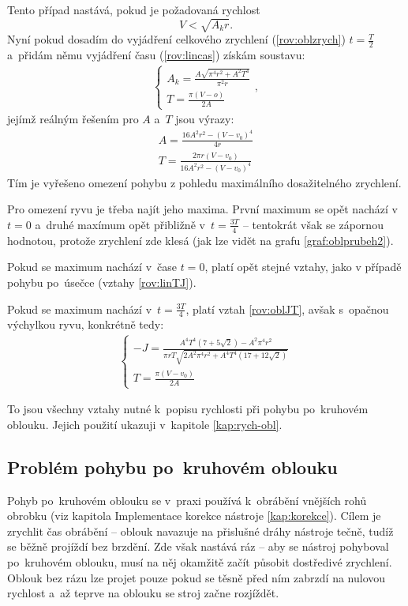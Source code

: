 		Tento případ nastává, pokud je požadovaná rychlost
		\begin{equation}
			V<\sqrt{A_k r}.
		\end{equation}
		Nyní pokud dosadím do vyjádření celkového zrychlení (\ref{rov:oblzrych}) $t=\frac{T}{2}$ a~přidám němu vyjádření času (\ref{rov:lincas}) získám soustavu:
		\begin{eqnarray}\label{rov:oblak}
			\begin{cases}
			A_k = \frac{A\sqrt{\pi^4r^2+A^2T^4}}{\pi^2r} \\
			T = \frac{\pi \left(V-o\right)}{2A}
			\end{cases},
		\end{eqnarray}
		jejímž reálným řešením pro $A$ a~$T$ jsou výrazy:
		\begin{eqnarray}\label{rov:oblt2a}
			A = \frac{16A^2r^2-\left(V-v_0\right)^4}{4r} \nonumber \\
			T = \frac{2\pi r \left(V-v_0\right)}{16A^2r^2-\left(V-v_0\right)^4}
		\end{eqnarray}
		Tím je vyřešeno omezení pohybu z pohledu maximálního dosažitelného zrychlení.
		
		Pro omezení ryvu je třeba najít jeho maxima. První maximum se opět nachází v~$t=0$ a~druhé maxímum opět přibližně v~$t=\frac{3T}{4}$ -- tentokrát však se zápornou hodnotou, protože zrychlení zde klesá (jak lze vidět na grafu \ref{graf:oblprubeh2}).
		
		Pokud se maximum nachází v~čase $t=0$, platí opět stejné vztahy, jako v případě pohybu po~úsečce (vztahy \ref{rov:linTJ}).
		
		Pokud se maximum nachází v~$t=\frac{3T}{4}$, platí vztah \ref{rov:oblJT}, avšak s~opačnou výchylkou ryvu, konkrétně tedy:
		\begin{eqnarray}
			\label{rov:oblJT2}
			\begin{cases}
			-J=\frac{A^4T^4\left(7+5\sqrt{2}\right)-A^2\pi^4r^2}{\pi rT\sqrt{2A^2\pi^4r^2+A^4T^4\left(17+12\sqrt{2}\right)}} \nonumber \\
			T=\frac{\pi(V-v_0)}{2A}
			\end{cases}
		\end{eqnarray}
		
		To jsou všechny vztahy nutné k~popisu rychlosti při pohybu po~kruhovém oblouku. Jejich použití ukazuji v~kapitole \ref{kap:rych-obl}.
		
		\subsection{Problém pohybu po~kruhovém oblouku}
		Pohyb po~kruhovém oblouku se v~praxi používá k~obrábění vnějších rohů obrobku (viz kapitola Implementace korekce nástroje \ref{kap:korekce}). Cílem je zrychlit čas obrábění -- oblouk navazuje na přislušné dráhy nástroje tečně, tudíž se běžně projíždí bez brzdění. Zde však nastává ráz -- aby se nástroj pohyboval po~kruhovém oblouku, musí na něj okamžitě začít působit dostředivé zrychlení. Oblouk bez rázu lze projet pouze pokud se těsně před ním zabrzdí na nulovou rychlost a~až teprve na oblouku se stroj začne rozjíždět.
		
